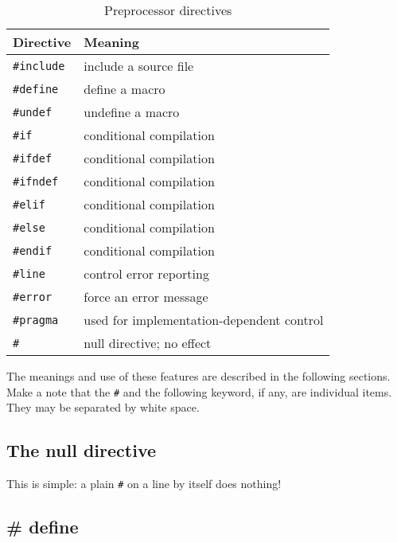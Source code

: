    \begin{table}[htb]
     \centering
     \begin{tabular}{ll}
       \toprule
       Directive          & Meaning   \\
       \midrule
       \texttt{\#include} & include a source file   \\
       \texttt{\#define}  & define a macro   \\
       \texttt{\#undef}   & undefine a macro   \\
       \texttt{\#if}      & conditional compilation   \\
       \texttt{\#ifdef}   & conditional compilation   \\
       \texttt{\#ifndef}  & conditional compilation   \\
       \texttt{\#elif}    & conditional compilation   \\
       \texttt{\#else}    & conditional compilation   \\
       \texttt{\#endif}   & conditional compilation   \\
       \texttt{\#line}    & control error reporting   \\
       \texttt{\#error}   & force an error message   \\
       \texttt{\#pragma}  & used for implementation-dependent control   \\
       \texttt{\#}        & null directive; no effect   \\
       \bottomrule
     \end{tabular}
     \caption{\label{tab:prepDir}Preprocessor directives}
   \end{table}


  The meanings and use of these features are described in the following
   sections. Make a note that the \texttt{\#} and the following keyword,
   if any, are individual items. They may be separated by white space.


  \subsection{The null directive}
   

   This is simple: a plain \texttt{\#} on a line by itself does
    nothing!


  

  \subsection{\# define}
   

